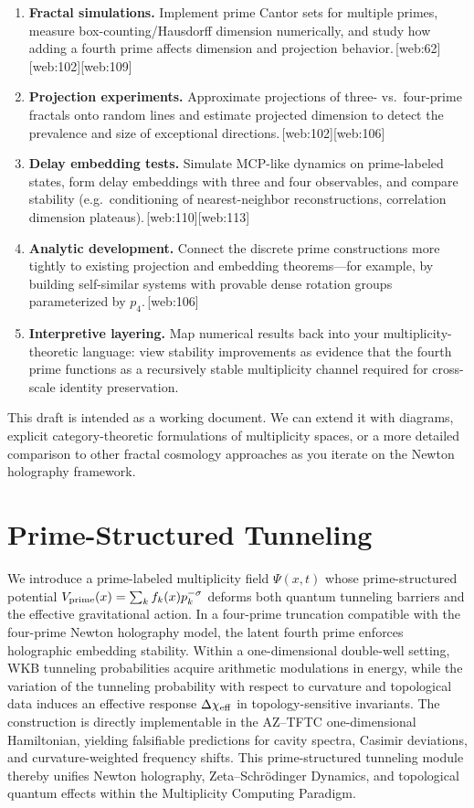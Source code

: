 \documentclass[11pt]{article}
\begin{document}
\begin{enumerate}[leftmargin=*]
  \item \textbf{Fractal simulations.} Implement prime Cantor sets for
  multiple primes, measure box-counting/Hausdorff dimension numerically,
  and study how adding a fourth prime affects dimension and projection
  behavior.\,[web:62][web:102][web:109]
  \item \textbf{Projection experiments.} Approximate projections of
  three- vs.\ four-prime fractals onto random lines and estimate
  projected dimension to detect the prevalence and size of exceptional
  directions.\,[web:102][web:106]
  \item \textbf{Delay embedding tests.} Simulate MCP-like dynamics on
  prime-labeled states, form delay embeddings with three and four
  observables, and compare stability (e.g.\ conditioning of nearest-neighbor
  reconstructions, correlation dimension plateaus).\,[web:110][web:113]
  \item \textbf{Analytic development.} Connect the discrete prime
  constructions more tightly to existing projection and embedding
  theorems---for example, by building self-similar systems with provable
  dense rotation groups parameterized by $p_4$.\,[web:106]
  \item \textbf{Interpretive layering.} Map numerical results back into
  your multiplicity-theoretic language: view stability improvements as
  evidence that the fourth prime functions as a recursively stable
  multiplicity channel required for cross-scale identity preservation.
\end{enumerate}

\bigskip

\noindent
This draft is intended as a working document.
We can extend it with diagrams, explicit category-theoretic formulations
of multiplicity spaces, or a more detailed comparison to other fractal
cosmology approaches as you iterate on the Newton holography framework.

\section{
Prime-Structured Tunneling}


We introduce a prime-labeled multiplicity field \(\Psi(x,t)\) whose
prime-structured potential
\(V_{\rm prime}(x) = \sum_k f_k(x) p_k^{-\sigma}\) deforms both quantum
tunneling barriers and the effective gravitational action. In a
four-prime truncation compatible with the four-prime Newton holography
model, the latent fourth prime enforces holographic embedding stability.
Within a one-dimensional double-well setting, WKB tunneling
probabilities acquire arithmetic modulations in energy, while the
variation of the tunneling probability with respect to curvature and
topological data induces an effective response \(\Delta\chi_{\rm eff}\)
in topology-sensitive invariants. The construction is directly
implementable in the AZ--TFTC one-dimensional Hamiltonian, yielding
falsifiable predictions for cavity spectra, Casimir deviations, and
curvature-weighted frequency shifts. This prime-structured tunneling
module thereby unifies Newton holography, Zeta--Schr\"odinger Dynamics,
and topological quantum effects within the Multiplicity Computing
Paradigm.
\end{document}
